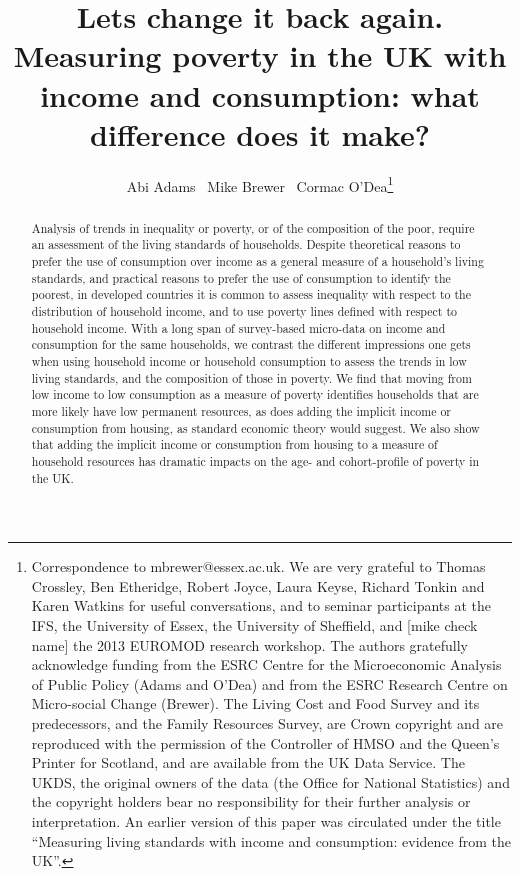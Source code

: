 \documentclass[11pt]{article} %
\title{Lets change it back again. Measuring poverty in the UK with income and consumption: what difference does it make?}
\author{Abi Adams \ Mike Brewer \ Cormac O'Dea\thanks{
Correspondence to mbrewer@essex.ac.uk. We are very grateful to Thomas Crossley, Ben Etheridge, Robert Joyce, Laura Keyse, Richard Tonkin and Karen Watkins for useful conversations, and to seminar participants at the IFS, the University of Essex, the University of Sheffield, and [mike check name] the 2013 EUROMOD research workshop. The authors gratefully acknowledge funding from the ESRC Centre for the Microeconomic Analysis of Public Policy (Adams and O'Dea) and from the ESRC Research Centre on Micro-social Change (Brewer). The Living Cost and Food Survey and its predecessors, and the Family Resources Survey, are Crown copyright and are reproduced with the permission of the Controller of HMSO and the Queen's Printer for Scotland, and are available from the UK Data Service. The UKDS, the original owners of the data (the Office for National Statistics) and the copyright holders bear no responsibility for their further analysis or interpretation. An earlier version of this paper was circulated under the title ``Measuring living standards with income and consumption: evidence from the UK''.}
}
\begin{document}
\maketitle

\begin{abstract}
%
Analysis of trends in inequality or poverty, or of the composition of the poor, require an assessment of the living standards of households. Despite theoretical reasons to prefer the use of consumption over income as a general measure of a household's living standards, and practical reasons to prefer the use of consumption to identify the poorest, in developed countries it is common to assess inequality with respect to the distribution of household income, and to use poverty lines defined with respect to household income. With a long span of survey-based micro-data on income and consumption for the same households, we contrast the different impressions one gets when using household income or household consumption to assess the trends in low living standards, and the composition of those in poverty. We find that moving from low income to low consumption as a measure of poverty identifies households that are more likely have low permanent resources, as does adding the implicit income or consumption from housing, as standard economic theory would suggest. We also show that adding the implicit income or consumption from housing to a measure of household resources has dramatic impacts on the age- and cohort-profile of poverty in the UK.
\end{abstract}









\newpage
%


\newpage
\appendix

%
\end{document}
